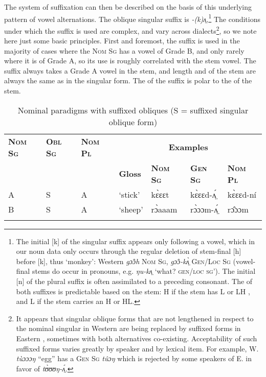 \documentclass[output=paper,newtxmath,modfonts,nonflat,draftmode]{langsci/langscibook}
\begin{document}
The system of suffixation can then be described on the basis of this underlying pattern of vowel alternations. The oblique singular suffix is \textit{{}-(k)}\textit{ʌ̤}.\footnote{The\label{fn:monich:13} initial [k] of the singular suffix appears only following a vowel, which in our noun data only occurs through the regular deletion of stem-final [h] before [k], thus ‘monkey’: Western  \textit{gɔ̂ɔh} \textsc{Nom Sg}, \textit{gɔ̂ɔ-kʌ̤̀} \textsc{Gen/Loc Sg} (vowel-final stems do occur in pronouns, e.g. \textit{ŋu-kʌ̤} ‘what? \textsc{gen/loc sg}’). The initial [n] of the plural suffix is often assimilated to a preceding  consonant. The  of both suffixes is predictable based on the stem: H if the stem has L or LH , and L if the stem carries an H or HL.} The conditions under which the suffix is used are complex, and vary across dialects\footnote{It\label{fn:monich:14} appears that singular oblique forms that are not lengthened in respect to the nominal singular in Western  are being replaced by suffixed forms in Eastern , sometimes with both alternatives co-existing. Acceptability of such suffixed forms varies greatly by speaker and by lexical item. For example, W.   \textit{tùɔɔɔŋ}  “egg” has a \textsc{Gen Sg} \textit{tûɔŋ} which is rejected by some speakers of E.  in favor of \textit{tʊ̀ʊʊŋ-ʌ̤́.}}, so we note here just some basic principles. First and foremost, the suffix is used in the majority of cases where the \textsc{Nom Sg} has a vowel of Grade B, and only rarely where it is of Grade A, so its use is roughly correlated with the stem vowel. The suffix always takes a Grade A vowel in the stem, and length and  of the stem are always the same as in the  singular form. The  of the suffix is polar to the  of the stem.

\begin{table}
\begin{tabularx}{\textwidth}{XXXXXXX}
\lsptoprule

\bfseries\scshape Nom Sg & \bfseries\scshape Obl Sg & \bfseries\scshape Nom Pl & \multicolumn{4}{c}{\bfseries Examples}\\
\cmidrule{4-7}
&  &  & \bfseries Gloss & \bfseries\scshape Nom Sg & \bfseries\scshape Gen Sg & \bfseries\scshape Nom Pl\\
\midrule
A & S & A & ‘stick’ & kɛ̀ɛɛt & kɛ̀ɛɛd-ʌ̤́ & kɛ̀ɛɛd-ní\\
B & S & A & ‘sheep’ & rɔ̀aaam & rɔ̀ɔɔm-ʌ̤́ & rɔ̂ɔɔm\\
\lspbottomrule
\end{tabularx}
\caption{Nominal paradigms with suffixed obliques  (S = suffixed singular oblique form)}
\label{tab:monich:18}
\end{table}
\end{document}
